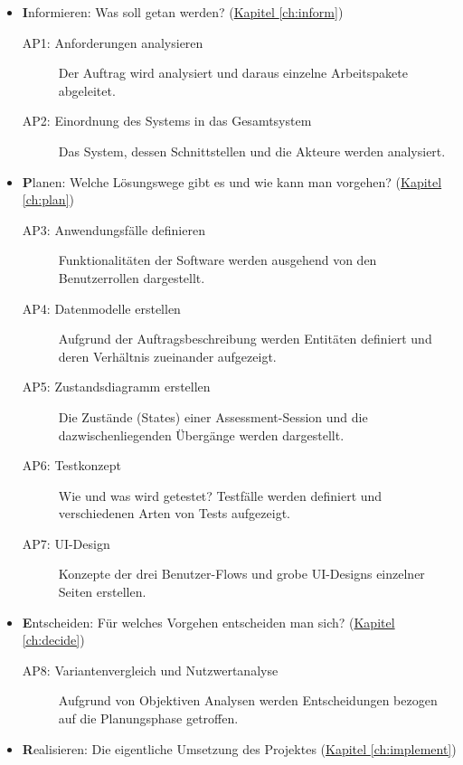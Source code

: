 \begin{itemize}
    \item \textbf{I}nformieren: Was soll getan werden? (\hyperref[ch:inform]{Kapitel \ref*{ch:inform}})
          \begin{description}
              \item[AP1: Anforderungen analysieren] Der Auftrag wird analysiert und daraus einzelne Arbeitspakete abgeleitet.
              \item[AP2: Einordnung des Systems in das Gesamtsystem] Das System, dessen Schnittstellen und die Akteure werden analysiert.
          \end{description}
    \item \textbf{P}lanen: Welche Lösungswege gibt es und wie kann man vorgehen? (\hyperref[ch:plan]{Kapitel \ref*{ch:plan}})
          \begin{description}
              \item[AP3: Anwendungsfälle definieren] Funktionalitäten der Software werden ausgehend von den Benutzerrollen dargestellt.
              \item[AP4: Datenmodelle erstellen] Aufgrund der Auftragsbeschreibung werden Entitäten definiert und deren Verhältnis zueinander aufgezeigt.
              \item[AP5: Zustandsdiagramm erstellen] Die Zustände (States) einer Assessment-Session und die dazwischenliegenden Übergänge werden dargestellt.
              \item[AP6: Testkonzept] Wie und was wird getestet? Testfälle werden definiert und verschiedenen Arten von Tests aufgezeigt.
              \item[AP7: UI-Design] Konzepte der drei Benutzer-Flows und grobe UI-Designs einzelner Seiten erstellen.
          \end{description}
    \item \textbf{E}ntscheiden: Für welches Vorgehen entscheiden man sich? (\hyperref[ch:decide]{Kapitel \ref*{ch:decide}})
          \begin{description}
              \item[AP8: Variantenvergleich und Nutzwertanalyse] Aufgrund von Objektiven Analysen werden Entscheidungen bezogen auf die Planungsphase getroffen.
          \end{description}
    \item \textbf{R}ealisieren: Die eigentliche Umsetzung des Projektes (\hyperref[ch:implement]{Kapitel \ref*{ch:implement}})
          \begin{description}

\end{description}
\end{itemize}
